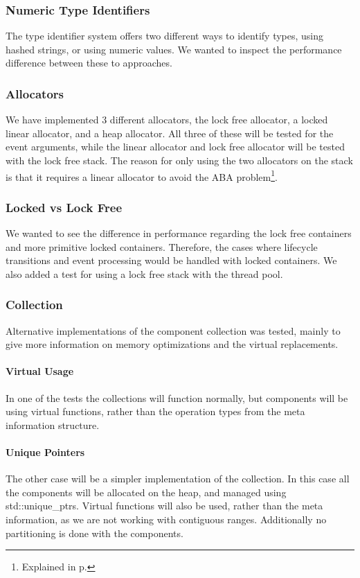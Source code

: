\subsubsection{Numeric Type Identifiers}
The type identifier system offers two different ways to identify types, using
hashed strings, or using numeric values.
We wanted to inspect the performance difference between these to approaches.

\subsubsection{Allocators}
We have implemented 3 different allocators, the lock free allocator,
a locked linear allocator, and a heap allocator.
All three of these will be tested for the event arguments, while the
linear allocator and lock free allocator will be tested with the lock free stack.
The reason for only using the two allocators on the stack is that it requires
a linear allocator to avoid the ABA problem\footnote{Explained in p.\pageref{subpar:detailed_lock_free_allocator_aba}}.

\subsubsection{Locked vs Lock Free}
We wanted to see the difference in performance regarding the lock free containers
and more primitive locked containers.
Therefore, the cases where lifecycle transitions and event processing
would be handled with locked containers.
We also added a test for using a lock free stack with the thread pool.

\subsubsection{Collection}
Alternative implementations of the component collection was tested,
mainly to give more information on memory optimizations and the virtual
replacements.

\paragraph{Virtual Usage}
In one of the tests the collections will function normally, but
components will be using virtual functions, rather than the operation types
from the meta information structure.

\paragraph{Unique Pointers}
The other case will be a simpler implementation of the collection.
In this case all the components will be allocated on the heap, and managed
using std::unique\_ptrs.
Virtual functions will also be used, rather than the meta information,
as we are not working with contiguous ranges.
Additionally no partitioning is done with the components.

